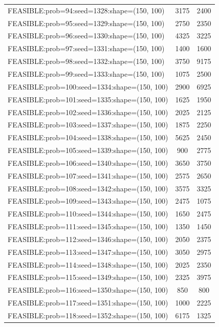 \begin{longtable}{lcc}
FEASIBLE:prob=94:seed=1328:shape=(150, 100)  &     3175 &  2400 \\
FEASIBLE:prob=95:seed=1329:shape=(150, 100)  &     2750 &  2350 \\
FEASIBLE:prob=96:seed=1330:shape=(150, 100)  &     4325 &  3225 \\
FEASIBLE:prob=97:seed=1331:shape=(150, 100)  &     1400 &  1600 \\
FEASIBLE:prob=98:seed=1332:shape=(150, 100)  &     3750 &  9175 \\
FEASIBLE:prob=99:seed=1333:shape=(150, 100)  &     1075 &  2500 \\
FEASIBLE:prob=100:seed=1334:shape=(150, 100) &     2900 &  6925 \\
FEASIBLE:prob=101:seed=1335:shape=(150, 100) &     1625 &  1950 \\
FEASIBLE:prob=102:seed=1336:shape=(150, 100) &     2025 &  2125 \\
FEASIBLE:prob=103:seed=1337:shape=(150, 100) &     1875 &  2250 \\
FEASIBLE:prob=104:seed=1338:shape=(150, 100) &     5625 &  2450 \\
FEASIBLE:prob=105:seed=1339:shape=(150, 100) &      900 &  2775 \\
FEASIBLE:prob=106:seed=1340:shape=(150, 100) &     3650 &  3750 \\
FEASIBLE:prob=107:seed=1341:shape=(150, 100) &     2575 &  2650 \\
FEASIBLE:prob=108:seed=1342:shape=(150, 100) &     3575 &  3325 \\
FEASIBLE:prob=109:seed=1343:shape=(150, 100) &     2475 &  1075 \\
FEASIBLE:prob=110:seed=1344:shape=(150, 100) &     1650 &  2475 \\
FEASIBLE:prob=111:seed=1345:shape=(150, 100) &     1350 &  1450 \\
FEASIBLE:prob=112:seed=1346:shape=(150, 100) &     2050 &  2375 \\
FEASIBLE:prob=113:seed=1347:shape=(150, 100) &     3050 &  2975 \\
FEASIBLE:prob=114:seed=1348:shape=(150, 100) &     2025 &  2350 \\
FEASIBLE:prob=115:seed=1349:shape=(150, 100) &     2325 &  3975 \\
FEASIBLE:prob=116:seed=1350:shape=(150, 100) &      850 &   800 \\
FEASIBLE:prob=117:seed=1351:shape=(150, 100) &     1000 &  2225 \\
FEASIBLE:prob=118:seed=1352:shape=(150, 100) &     6175 &  1325 \\

\end{longtable}

